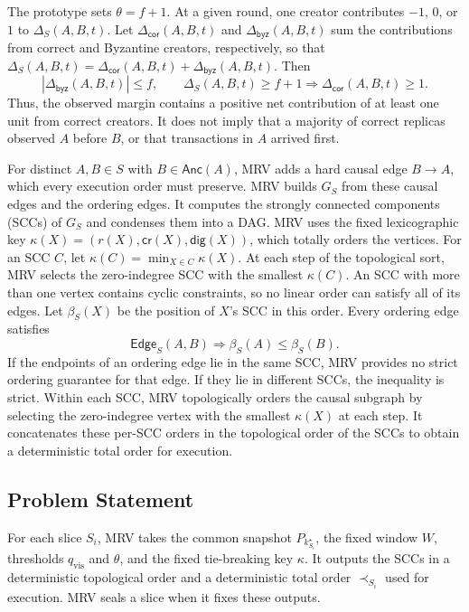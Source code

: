 The prototype sets $\theta=f+1$. At a given round, one creator contributes $-1$, $0$, or $1$ to $\Delta_S(A,B,t)$. Let
$\Delta_{\mathsf{cor}}(A,B,t)$ and $\Delta_{\mathsf{byz}}(A,B,t)$ sum the contributions from correct and Byzantine creators, respectively, so that $\Delta_S(A,B,t)=\Delta_{\mathsf{cor}}(A,B,t) +\Delta_{\mathsf{byz}}(A,B,t)$. Then
\[
\left|\Delta_{\mathsf{byz}}(A,B,t)\right|\leq f,
\qquad
\Delta_S(A,B,t)\geq f+1
\Longrightarrow
\Delta_{\mathsf{cor}}(A,B,t)\geq1 .
\]
Thus, the observed margin contains a positive net contribution of at least one unit from correct creators. It does not imply that a majority of correct replicas observed $A$ before $B$, or that transactions in $A$ arrived first.

For distinct $A,B\in S$ with $B\in\mathsf{Anc}(A)$, MRV adds a hard causal edge $B\to A$, which every execution order must preserve. MRV builds $G_S$ from these causal edges and the ordering edges. It computes the strongly connected components (SCCs) of $G_S$ and condenses them into a DAG. MRV uses
the fixed lexicographic key $\kappa(X)=(r(X),\mathsf{cr}(X),\mathsf{dig}(X))$, which totally orders the vertices. For an SCC $C$, let $\kappa(C)=\min_{X\in C}\kappa(X)$. At each step of the topological sort, MRV selects the zero-indegree SCC with the smallest $\kappa(C)$. An SCC with more than one vertex contains cyclic constraints, so no linear order can satisfy all of its edges. Let $\beta_S(X)$ be the position of $X$'s SCC in this order. Every ordering edge satisfies
\[
\mathsf{Edge}_S(A,B)
\Longrightarrow \beta_S(A)\leq\beta_S(B).
\]
If the endpoints of an ordering edge lie in the same SCC, MRV provides no strict ordering guarantee for that edge. If they lie in different SCCs, the inequality is strict. Within each SCC, MRV topologically orders the causal subgraph by selecting the zero-indegree vertex with the smallest $\kappa(X)$ at each step. It concatenates these per-SCC orders in the topological order of the SCCs to obtain a deterministic total order for execution.

\subsection{Problem Statement}
\label{sec:problem}

For each slice $S_i$, MRV takes the common snapshot $P_{k^\star_{S_i}}$, the fixed window $W$, thresholds $q_{\mathrm{vis}}$ and $\theta$, and the fixed tie-breaking key $\kappa$. It outputs the SCCs in a deterministic topological order and a deterministic total order $\prec_{S_i}$ used for execution. MRV seals a slice when it fixes these outputs.

